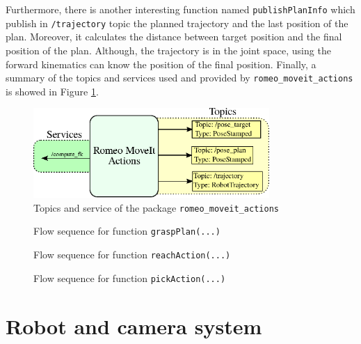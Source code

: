 \documentclass[12pt,a4paper,final,twoside,openright]{report}
\begin{document}
Furthermore, there is another interesting function named \texttt{publishPlanInfo} which publish in \texttt{/trajectory} topic the planned trajectory and the last position of the plan. Moreover, it calculates the distance between target position and the final position of the plan. Although, the trajectory is in the joint space, using the forward kinematics can know the position of the final position. Finally, a summary of the topics and services used and provided by \texttt{romeo\_moveit\_actions} is showed in Figure \ref{fig:moveit_actions_ROS}. 

\begin{figure}[!h]
\centering
\includegraphics[width=0.8\textwidth]{images/moveit_actions_ROS.eps}
\caption{Topics and service of the package \texttt{romeo\_moveit\_actions}\label{fig:moveit_actions_ROS}}
\end{figure}

\begin{figure}[!h]
\centering

\caption{Flow sequence for function \texttt{graspPlan(...)}\label{fig:moveit_actions_grasp_plan}}
\end{figure}

\begin{figure}[!h]
\centering

\caption{Flow sequence for function \texttt{reachAction(...)}\label{fig:moveit_actions_reach_action}}
\end{figure}

\begin{figure}[!ħ]
\centering

\caption{Flow sequence for function \texttt{pickAction(...)}\label{fig:moveit_actions_pick_action}}
\end{figure}

\chapter{Robot and camera system}
\label{cha:pre_studies}
\end{document}
